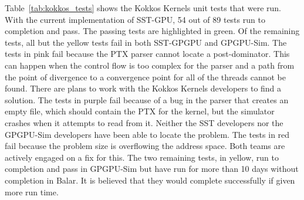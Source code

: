 Table~\ref{tab:kokkos_tests} shows the Kokkos Kernels unit tests that were run.
With the current implementation of SST-GPU, 54 out of 89 tests run to completion
and pass. The passing tests are highlighted in green. Of the remaining tests,
all but the yellow tests fail in both SST-GPGPU and GPGPU-Sim. The tests in pink
fail because the PTX parser cannot locate a post-dominator. This can happen when
the control flow is too complex for the parser and a path from the point of
divergence to a convergence point for all of the threads cannot be found. There
are plans to work with the Kokkos Kernels developers to find a solution. The
tests in purple fail because of a bug in the parser that creates an empty file,
which should contain the PTX for the kernel, but the simulator crashes when it
attempts to read from it. Neither the SST developers nor the GPGPU-Sim
developers have been able to locate the problem. The tests in red fail because
the problem size is overflowing the address space. Both teams are actively
engaged on a fix for this. The two remaining tests, in yellow, run to completion
and pass in GPGPU-Sim but have run for more than 10 days without completion
in Balar. It is believed that they would complete successfully if given more run time.

